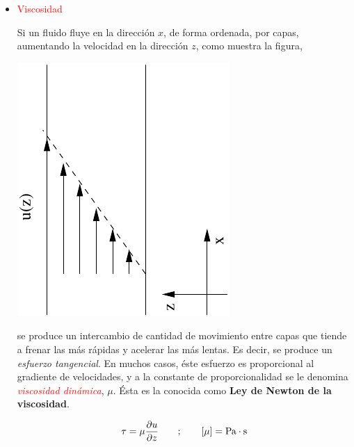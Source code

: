 \begin{itemize}
\begin{itemize}
\begin{quotation}
			\subsection*{Ejercicio} 
			Para el agua, a $20^\circ C$ y presi\'on atmosf\'erica, $\beta_T \approx \unit[2.2\times 10^9]{Pa}$
			y $\rho \approx \unit[1000]{Kg/m^3}$.
			Calcular para qu\'e orden de magnitud de velocidad de flujo el agua debe empezar a considerarse compresible.
		\end{quotation}
		
		\item{\textcolor{red}{Viscosidad}}
		
		Si un fluido fluye en la direcci\'on $x$, de forma ordenada, por capas, aumentando la velocidad en la direcci\'on
		$z$, como muestra la figura,
		
		\begin{center}
			\includegraphics[scale=1,angle=270]{TeX_files/chapter01-Introduccion/u_z.pdf}
		\end{center}
		
		se produce un intercambio de cantidad de movimiento entre capas que tiende a frenar las m\'as r\'apidas y acelerar las m\'as lentas. Es decir, se produce un \textit{esfuerzo tangencial}. En muchos casos, \'este esfuerzo es proporcional al gradiente de velocidades, y a la constante de proporcionalidad se le denomina \textit{\textcolor{red}{viscosidad din\'amica}}, $\mu$. Ésta es la conocida como \textbf{Ley de Newton de la viscosidad}.
		
		\begin{equation}
			\tau = \mu \frac{\partial u}{\partial z} \qquad ; \qquad \left[\mu\right] = \textrm{Pa}\cdot\textrm{s}
		\end{equation}
		

\end{itemize}
\end{itemize}
